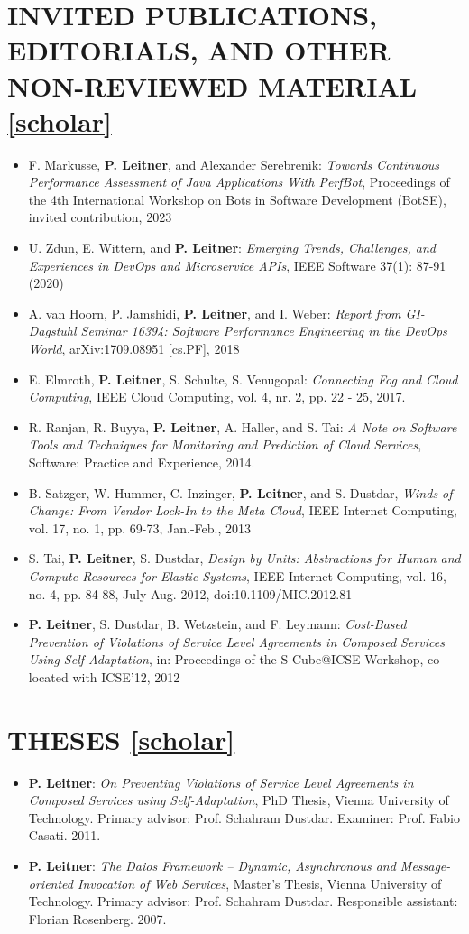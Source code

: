 \documentclass[paper=letter,fontsize=11pt]{scrartcl} %
\newcommand{\NewPart}[2]{\section*{\uppercase{#1} #2}}
\begin{document}
\NewPart{Invited Publications, Editorials, and Other Non-Reviewed Material}{\href{https://scholar.google.ch/citations?user=wZ9f8CAAAAAJ}{[scholar]}}

\begin{itemize}
  \item  F. Markusse, \textbf{P. Leitner}, and  Alexander Serebrenik: \emph{Towards Continuous Performance Assessment of Java Applications With PerfBot}, Proceedings of the 4th International Workshop on Bots in Software Development (BotSE), invited contribution, 2023
	\item  U. Zdun, E. Wittern, and \textbf{P. Leitner}: \emph{Emerging Trends, Challenges, and Experiences in DevOps and Microservice APIs}, IEEE Software 37(1): 87-91 (2020)
	\item A. van Hoorn, P. Jamshidi, \textbf{P. Leitner}, and I. Weber:
	\emph{Report from GI-Dagstuhl Seminar 16394: Software Performance Engineering in the DevOps World}, arXiv:1709.08951 [cs.PF], 2018
	\item E. Elmroth, \textbf{P. Leitner}, S. Schulte, S. Venugopal:
  \emph{Connecting Fog and Cloud Computing}, IEEE Cloud Computing, vol. 4, nr. 2, pp. 22 - 25, 2017.
  \item R. Ranjan, R. Buyya, \textbf{P. Leitner}, A. Haller, and S. Tai:
  \emph{A Note on Software Tools and Techniques for Monitoring and Prediction of Cloud Services}, Software: Practice and Experience, 2014.
  \item B. Satzger, W. Hummer, C. Inzinger, \textbf{P. Leitner}, and S. Dustdar, \emph{Winds of Change: From Vendor Lock-In to the Meta Cloud}, IEEE Internet Computing, vol. 17, no. 1, pp. 69-73, Jan.-Feb., 2013
  \item S. Tai, \textbf{P. Leitner}, S. Dustdar, \emph{Design by Units: Abstractions for Human and Compute Resources for Elastic Systems}, IEEE Internet Computing, vol. 16, no. 4, pp. 84-88, July-Aug. 2012, doi:10.1109/MIC.2012.81
  \item \textbf{P. Leitner}, S. Dustdar, B. Wetzstein, and F.
  Leymann: \emph{Cost-Based Prevention of Violations of Service Level Agreements
  in Composed Services Using Self-Adaptation}, in: Proceedings of the S-Cube@ICSE Workshop, co-located with ICSE'12, 2012
\end{itemize}

\NewPart{Theses}{\href{https://scholar.google.ch/citations?user=wZ9f8CAAAAAJ}{[scholar]}}

\begin{itemize}
  \item \textbf{P. Leitner}: \emph{On Preventing Violations of Service Level
  Agreements in Composed Services using Self-Adaptation},  PhD Thesis, Vienna
  University of Technology. Primary advisor: Prof. Schahram Dustdar. Examiner:
  Prof. Fabio Casati. 2011.
  \item \textbf{P. Leitner}: \emph{The Daios Framework -- Dynamic, Asynchronous
  and Message-oriented Invocation of Web Services},  Master's Thesis, Vienna
  University of Technology. Primary advisor: Prof. Schahram Dustdar. Responsible
  assistant: Florian Rosenberg. 2007.
\end{itemize}
\end{document}
